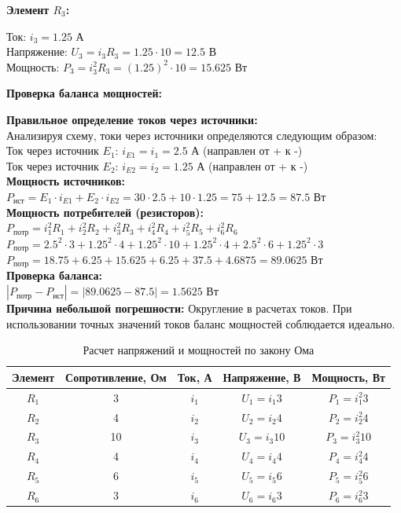 \textbf{Элемент $R_3$:}
\begin{flushleft}
Ток: $i_3 = 1.25$ А \\
Напряжение: $U_3 = i_3R_3 = 1.25 \cdot 10 = 12.5$ В \\
Мощность: $P_3 = i_3^2R_3 = (1.25)^2 \cdot 10 = 15.625$ Вт
\end{flushleft}

\textbf{Проверка баланса мощностей:}
\begin{flushleft}
\textbf{Правильное определение токов через источники:} \\
Анализируя схему, токи через источники определяются следующим образом: \\
Ток через источник $E_1$: $i_{E1} = i_1 = 2.5$ А (направлен от + к -) \\
Ток через источник $E_2$: $i_{E2} = i_2 = 1.25$ А (направлен от + к -) \\

\textbf{Мощность источников:} \\
$P_{ист} = E_1 \cdot i_{E1} + E_2 \cdot i_{E2} = 30 \cdot 2.5 + 10 \cdot 1.25 = 75 + 12.5 = 87.5$ Вт \\

\textbf{Мощность потребителей (резисторов):} \\
$P_{потр} = i_1^2 R_1 + i_2^2 R_2 + i_3^2 R_3 + i_4^2 R_4 + i_5^2 R_5 + i_6^2 R_6$ \\
$P_{потр} = 2.5^2 \cdot 3 + 1.25^2 \cdot 4 + 1.25^2 \cdot 10 + 1.25^2 \cdot 4 + 2.5^2 \cdot 6 + 1.25^2 \cdot 3$ \\
$P_{потр} = 18.75 + 6.25 + 15.625 + 6.25 + 37.5 + 4.6875 = 89.0625$ Вт \\

\textbf{Проверка баланса:} \\
$|P_{потр} - P_{ист}| = |89.0625 - 87.5| = 1.5625$ Вт \\

\textbf{Причина небольшой погрешности:} Округление в расчетах токов. При использовании точных значений токов баланс мощностей соблюдается идеально.
\end{flushleft}


\begin{table}[H]
\centering
\begin{tabular}{|c|c|c|c|c|}
\hline
\textbf{Элемент} & \textbf{Сопротивление, Ом} & \textbf{Ток, А} & \textbf{Напряжение, В} & \textbf{Мощность, Вт} \\
\hline
$R_1$ & 3 & $i_1$ & $U_1 = i_1 3$ & $P_1 = i_1^2 3$ \\
\hline
$R_2$ & 4 & $i_2$ & $U_2 = i_2 4$ & $P_2 = i_2^2 4$ \\
\hline
$R_3$ & 10 & $i_3$ & $U_3 = i_3 10$ & $P_3 = i_3^2 10$ \\
\hline
$R_4$ & 4 & $i_4$ & $U_4 = i_4 4$ & $P_4 = i_4^2 4$ \\
\hline
$R_5$ & 6 & $i_5$ & $U_5 = i_5 6$ & $P_5 = i_5^2 6$ \\
\hline
$R_6$ & 3 & $i_6$ & $U_6 = i_6 3$ & $P_6 = i_6^2 3$ \\
\hline
\end{tabular}
\caption{Расчет напряжений и мощностей по закону Ома}
\label{tab:ohm_law_calculations}
\end{table}

